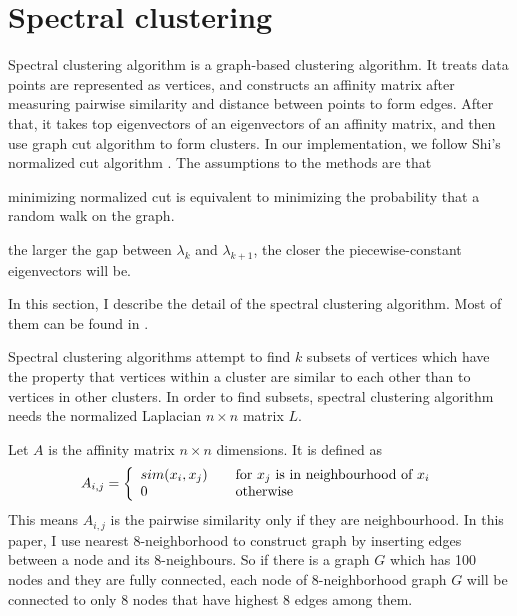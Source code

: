 \section{Spectral clustering}
Spectral clustering algorithm is a graph-based clustering algorithm. 
It treats data points are represented as vertices, and constructs an affinity matrix after measuring pairwise similarity and distance between points to form edges. 
After that, it takes top eigenvectors of an eigenvectors of an affinity matrix, and then use graph cut algorithm to form clusters. 
In our implementation, we follow Shi's normalized cut algorithm \cite{jianbo03}. 
The assumptions to the methods are that \begin{inparaenum}[\itshape a\upshape)]
\item minimizing normalized cut is equivalent to minimizing the probability that a random walk on the graph.
\item the larger the gap between $\lambda_{k}$ and $\lambda_{k+1}$, the closer the piecewise-constant eigenvectors will be.
\end{inparaenum}
In this section, I describe the detail of the spectral clustering algorithm. 
Most of them can be found in \cite{ulrike07}. 

Spectral clustering algorithms attempt to find $k$ subsets of vertices which have the property that vertices within a cluster are similar to each other than to vertices in other clusters. 
In order to find subsets, spectral clustering algorithm needs the normalized Laplacian $n \times n$ matrix $L$. 

Let $A$ is the affinity matrix $n \times n$ dimensions. It is defined as 
\begin{equation}
A_{i,j} = \left\{ 
  \begin{array}{l l}
    sim(x_i, x_j) & \quad \text{for $x_j$ is in neighbourhood of $x_i$}\\
    0 & \quad \text{otherwise}
  \end{array} \right.
\end{equation}
This means $A_{i,j}$ is the pairwise similarity only if they are neighbourhood. 
In this paper, I use nearest 8-neighborhood to construct graph by inserting edges between a node and its 8-neighbours. 
So if there is a graph $G$ which has 100 nodes and they are fully connected, each node of 8-neighborhood graph $G$ will be connected to only 8 nodes that have highest 8 edges among them. 

